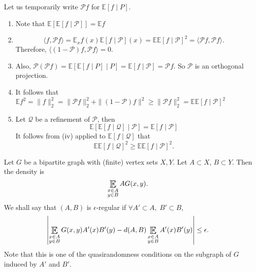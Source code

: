\documentclass{article}
\DeclareMathOperator*{\E}{\scalerel*{\mathbb{E}}{\textstyle\sum}}
\newcommand{\1}[1]{\mathbbm{1}_{#1}}
\begin{document}
Let us temporarily write $\mathcal{P}f$ for $\mathbb{E}[f \mid P]$.
\begin{enumerate}[label=(\roman*)]
  \item Note that $\mathbb{E}[\mathbb{E}[f \mid \mathcal{P}]] = \mathbb{E} f$
  \item
    \begin{equation*}\langle f, \mathcal{P} f \rangle = \mathbb{E}_x f(x) \mathbb{E}[f \mid \mathcal{P}](x) = \mathbb{E} \mathbb{E}[f \mid \mathcal{P}]^2 = \langle \mathcal{P} f, \mathcal{P} f \rangle.\end{equation*}
    Therefore, $\langle (1-\mathcal{P})f, \mathcal{P} f \rangle = 0$.
  \item Also, $\mathcal{P}(\mathcal{P}f) = \mathbb{E}[\mathbb{E}[f \mid P] \mid P] = \mathbb{E}[f \mid \mathcal{P}] = \mathcal{P} f$.
    So $\mathcal{P}$ is an orthogonal projection.
  \item It follows that $\mathbb{E}f^2 = \|f\|_2^2 = \|\mathcal{P}f\|_2^2 + \|(1-\mathcal{P}) f\|^2 \geq \|\mathcal{P}f\|_2^2 = \mathbb{E} \mathbb{E}[f \mid \mathcal{P}]^2$
  \item Let $\mathcal{Q}$ be a refinement of $\mathcal{P}$, then
    \begin{equation*}
      \mathbb{E}[\mathbb{E}[f \mid \mathcal{Q}] \mid \mathcal{P}] = \mathbb{E}[f \mid \mathcal{P}]
    \end{equation*}
    It follows from (iv) applied to $\mathbb{E}[f \mid \mathcal{Q}]$ that
    \begin{equation*}
      \mathbb{E}\mathbb{E}[f \mid \mathcal{Q}]^2 \geq \mathbb{E}\mathbb{E}[f \mid \mathcal{P}]^2.
    \end{equation*}
\end{enumerate}
\begin{defi}
  Let $G$ be a bipartite graph with (finite) vertex sets $X,Y$.
  Let $A \subset X$, $B \subset Y$. Then the density is
  \begin{equation*}
    \E_{\substack{x \in A\\y\in B}}A G(x,y).
  \end{equation*}
  We shall say that $(A,B)$ is $\epsilon$-regular if $\forall A' \subset A,\; B' \subset B$,
  \begin{equation*}
    \left\lvert \E_{\substack{x \in A \\ y \in B}} G(x,y) A'(x) B'(y) - d(A,B) \E_{\substack{x \in A \\ y \in B}} A'(x) B'(y)\right\rvert \leq \epsilon.
  \end{equation*}
  Note that this is one of the quasirandomness conditions on the subgraph of $G$ induced by $A'$ and $B'$.
\end{defi}
\end{document}
